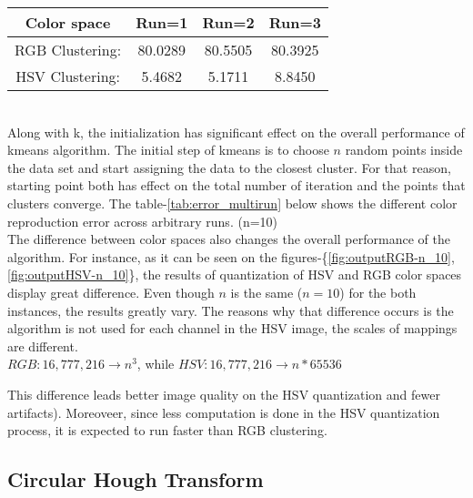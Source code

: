 \documentclass{article}
\begin{document}
	\label{tab:error_multirun}	
	\begin{tabular}{ | c || c | c | c |}
	\hline			 
	Color space 	& Run=1 & Run=2 & Run=3\\ \hline
	RGB Clustering: & 80.0289 & 80.5505 & 80.3925\\
	HSV Clustering: &  5.4682 &  5.1711 &  8.8450\\
	\hline  	
	\end{tabular} \\
 
	Along with k, the initialization has significant effect on the overall
	performance of kmeans algorithm. The initial step of kmeans is to choose $n$
	random points inside the data set and start assigning the data to the closest
	cluster. For that reason, starting point both has effect on the total number of
	iteration and the points that clusters converge. The
	table-\ref{tab:error_multirun} below shows the different color reproduction
	error across arbitrary runs. (n=10)	\\
	The difference between color spaces also changes the overall performance of the
	algorithm. For instance, as it can be seen on the
	figures-\{\ref{fig:outputRGB-n_10}, \ref{fig:outputHSV-n_10}\}, the results of
	quantization of HSV and RGB color spaces display great difference. Even though
	$n$ is the same ($n=10$) for the both instances, the results greatly vary. The
	reasons why that difference occurs is the algorithm is not used for each
	channel in the HSV image, the scales of mappings are different. \\
	$RGB: 16,777,216\rightarrow n^3$, while $HSV: 16,777,216\rightarrow n*65536$
	
	This difference leads better image quality on the HSV quantization and fewer
	artifacts). Moreoveer, since less computation is done in the HSV quantization
	process, it is expected to run faster than RGB clustering.
	
	\subsection{Circular Hough Transform}
\end{document}
